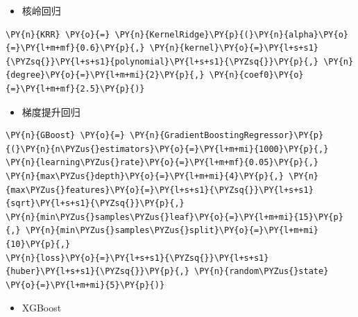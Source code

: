 \documentclass[no-math]{YangThesis}
\begin{document}
\begin{itemize}
	\tightlist
	\item
	核岭回归
\end{itemize}

\begin{tcolorbox}[breakable, size=fbox, boxrule=1pt, pad at break*=1mm,colback=cellbackground, colframe=cellborder]
	\begin{Verbatim}[commandchars=\\\{\}]
\PY{n}{KRR} \PY{o}{=} \PY{n}{KernelRidge}\PY{p}{(}\PY{n}{alpha}\PY{o}{=}\PY{l+m+mf}{0.6}\PY{p}{,} \PY{n}{kernel}\PY{o}{=}\PY{l+s+s1}{\PYZsq{}}\PY{l+s+s1}{polynomial}\PY{l+s+s1}{\PYZsq{}}\PY{p}{,} \PY{n}{degree}\PY{o}{=}\PY{l+m+mi}{2}\PY{p}{,} \PY{n}{coef0}\PY{o}{=}\PY{l+m+mf}{2.5}\PY{p}{)}
	\end{Verbatim}
\end{tcolorbox}

\begin{itemize}
	\tightlist
	\item
	梯度提升回归
\end{itemize}

\begin{tcolorbox}[breakable, size=fbox, boxrule=1pt, pad at break*=1mm,colback=cellbackground, colframe=cellborder]
	\begin{Verbatim}[commandchars=\\\{\}]
\PY{n}{GBoost} \PY{o}{=} \PY{n}{GradientBoostingRegressor}\PY{p}{(}\PY{n}{n\PYZus{}estimators}\PY{o}{=}\PY{l+m+mi}{1000}\PY{p}{,} \PY{n}{learning\PYZus{}rate}\PY{o}{=}\PY{l+m+mf}{0.05}\PY{p}{,}
\PY{n}{max\PYZus{}depth}\PY{o}{=}\PY{l+m+mi}{4}\PY{p}{,} \PY{n}{max\PYZus{}features}\PY{o}{=}\PY{l+s+s1}{\PYZsq{}}\PY{l+s+s1}{sqrt}\PY{l+s+s1}{\PYZsq{}}\PY{p}{,}
\PY{n}{min\PYZus{}samples\PYZus{}leaf}\PY{o}{=}\PY{l+m+mi}{15}\PY{p}{,} \PY{n}{min\PYZus{}samples\PYZus{}split}\PY{o}{=}\PY{l+m+mi}{10}\PY{p}{,} 
\PY{n}{loss}\PY{o}{=}\PY{l+s+s1}{\PYZsq{}}\PY{l+s+s1}{huber}\PY{l+s+s1}{\PYZsq{}}\PY{p}{,} \PY{n}{random\PYZus{}state} \PY{o}{=}\PY{l+m+mi}{5}\PY{p}{)}
	\end{Verbatim}
\end{tcolorbox}

\begin{itemize}
	\tightlist
	\item
	XGBoost
\end{itemize}
\end{document}
